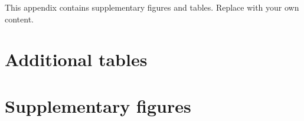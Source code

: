 %

This appendix contains supplementary figures and tables. Replace with your own content.

\section{Additional tables}

\lipsum[63-64]

\section{Supplementary figures}

\lipsum[65-66]
